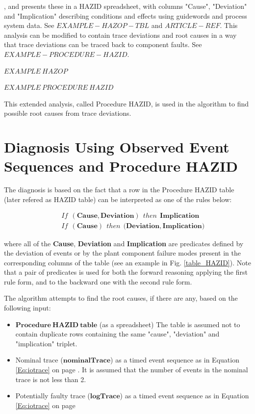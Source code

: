 \documentclass[conference]{IEEEtran}
\begin{document}
, and presents these in a HAZID spreadsheet, with columns "Cause", "Deviation" and "Implication" describing conditions and effects using guidewords and process system data. See $EXAMPLE-HAZOP-TBL$ and $ARTICLE-REF$. This analysis can be modified to contain trace deviations and root causes in a way that trace deviations can be traced back to component faults. See $EXAMPLE-PROCEDURE-HAZID$. 

$EXAMPLE~HAZOP$

$EXAMPLE~PROCEDURE~HAZID$

This extended analysis, called Procedure HAZID, is used in the algorithm to find possible root causes from trace deviations.
%
\section{Diagnosis Using Observed Event Sequences and Procedure HAZID}
\label{sec:reasoning}

The diagnosis is based on the fact that a row in the Procedure HAZID 
table (later refered as HAZID table) can be interpreted as one of the rules below:
\begin{small}
\begin{eqnarray*}
&& If~~\mathbf{(Cause,Deviation)}~~then~~\mathbf{Implication} \\
&& If~~\mathbf{(Cause)}~~then~~\mathbf{(Deviation,Implication})
\end{eqnarray*}
\end{small}
\noindent where all of the \textbf{Cause}, \textbf{Deviation} and \textbf{Implication}
 are predicates
 defined by the deviation of events or by the plant component failure modes
present in the corresponding columns of the table (see an example in Fig. \ref{table_HAZID}).
Note that a pair of predicates is used for both the forward reasoning
 applying the first rule form, and to the backward one with the second rule form.

 
The algorithm attempts to find the root causes, if there are any, based on the following input:
\begin{itemize}
	\item $\mathbf{Procedure~HAZID~table}$ (as a spreadsheet) The table is assumed not to contain duplicate rows containing the same "cause", "deviation" and "implication" triplet.
	\item Nominal trace ($\mathbf{nominalTrace}$) as a timed event sequence as in Equation \ref{Eq:iotrace} on page \pageref{Eq:iotrace}. It is assumed that the number of events in the nominal trace is not less than 2.
	\item Potentially faulty trace ($\mathbf{logTrace}$) as a timed event sequence as in Equation \ref{Eq:iotrace} on page \pageref{Eq:iotrace}
\end{itemize}
\end{document}
